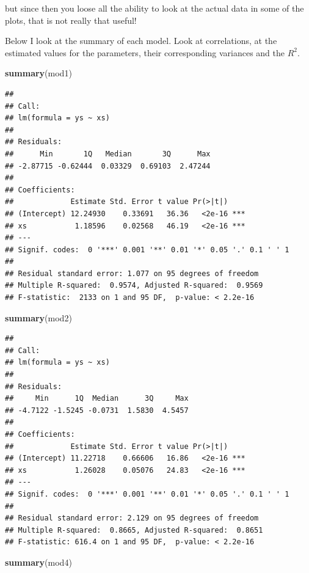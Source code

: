 \documentclass[
]{book}
\newenvironment{Shaded}{\begin{snugshade}}{\end{snugshade}}
\newcommand{\FunctionTok}[1]{\textcolor[rgb]{0.13,0.29,0.53}{\textbf{#1}}}
\newcommand{\NormalTok}[1]{#1}
\begin{document}
but since then you loose all the ability to look at the actual data in some of the plots, that is not really that useful!

Below I look at the summary of each model. Look at correlations, at the estimated values for the parameters, their corresponding variances and the \(R^2\).

\begin{Shaded}
\begin{Highlighting}[]
\FunctionTok{summary}\NormalTok{(mod1)}
\end{Highlighting}
\end{Shaded}

\begin{verbatim}
## 
## Call:
## lm(formula = ys ~ xs)
## 
## Residuals:
##      Min       1Q   Median       3Q      Max 
## -2.87715 -0.62444  0.03329  0.69103  2.47244 
## 
## Coefficients:
##             Estimate Std. Error t value Pr(>|t|)    
## (Intercept) 12.24930    0.33691   36.36   <2e-16 ***
## xs           1.18596    0.02568   46.19   <2e-16 ***
## ---
## Signif. codes:  0 '***' 0.001 '**' 0.01 '*' 0.05 '.' 0.1 ' ' 1
## 
## Residual standard error: 1.077 on 95 degrees of freedom
## Multiple R-squared:  0.9574, Adjusted R-squared:  0.9569 
## F-statistic:  2133 on 1 and 95 DF,  p-value: < 2.2e-16
\end{verbatim}

\begin{Shaded}
\begin{Highlighting}[]
\FunctionTok{summary}\NormalTok{(mod2)}
\end{Highlighting}
\end{Shaded}

\begin{verbatim}
## 
## Call:
## lm(formula = ys ~ xs)
## 
## Residuals:
##     Min      1Q  Median      3Q     Max 
## -4.7122 -1.5245 -0.0731  1.5830  4.5457 
## 
## Coefficients:
##             Estimate Std. Error t value Pr(>|t|)    
## (Intercept) 11.22718    0.66606   16.86   <2e-16 ***
## xs           1.26028    0.05076   24.83   <2e-16 ***
## ---
## Signif. codes:  0 '***' 0.001 '**' 0.01 '*' 0.05 '.' 0.1 ' ' 1
## 
## Residual standard error: 2.129 on 95 degrees of freedom
## Multiple R-squared:  0.8665, Adjusted R-squared:  0.8651 
## F-statistic: 616.4 on 1 and 95 DF,  p-value: < 2.2e-16
\end{verbatim}

\begin{Shaded}
\begin{Highlighting}[]
\FunctionTok{summary}\NormalTok{(mod4)}
\end{Highlighting}
\end{Shaded}
\end{document}
